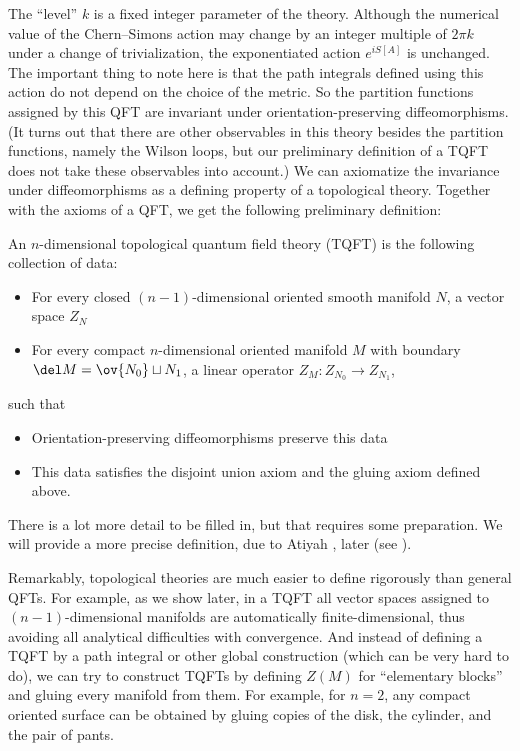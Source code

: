 The ``level'' $k$ is a fixed integer parameter of the theory. Although the
numerical value of the Chern--Simons action may change by an integer multiple of
$2\pi k$ under a change of trivialization, the exponentiated action $e^{i S[A]}$
is unchanged. The important thing to note here is that the path integrals
defined using this action do not depend on the choice of the metric. So the
partition functions assigned by this QFT are invariant under
orientation-preserving diffeomorphisms. (It turns out that there are other
observables in this theory besides the partition functions, namely the Wilson
loops, but our preliminary definition of a TQFT does not take these observables
into account.) We can axiomatize the invariance under diffeomorphisms as a
defining property of a topological theory. Together with the axioms of a QFT, we
get the following preliminary definition:

\begin{predefinition}\label{d:ptqft}
  An $n$-dimensional topological quantum field theory (TQFT) is the following
  collection of data:
  \begin{itemize}
    \item For every closed $(n-1)$-dimensional oriented smooth manifold $N$, a
      vector space $Z_N$
    \item For every compact $n$-dimensional oriented manifold $M$ with boundary
      $\del M=\ov{N_0}\sqcup N_1$, a linear operator
      $Z_M\colon Z_{N_0}\to Z_{N_1}$,
  \end{itemize}

  such that

  \begin{itemize}
  	\item Orientation-preserving diffeomorphisms preserve this data
  	\item This data satisfies the disjoint union axiom and the gluing axiom
  	  defined above.
  \end{itemize}

\end{predefinition}

There is a lot more detail to be filled in, but that requires some preparation.
We will provide a more precise definition, due to Atiyah \cite{atiyah}, later
(see ).

Remarkably, topological theories are much easier to define rigorously than
general QFTs. For example, as we show later, in a TQFT all vector spaces
assigned to $(n-1)$-dimensional manifolds are automatically finite-dimensional,
thus avoiding all analytical difficulties with convergence. And instead of
defining a TQFT by a path integral or other global construction (which can be
very hard to do), we can try to construct TQFTs by defining $Z(M)$ for
``elementary blocks'' and gluing every manifold from them. For example, for
$n=2$, any compact oriented surface can be obtained by gluing copies of the
disk, the cylinder, and the pair of pants.
\begin{center}
\end{center}

